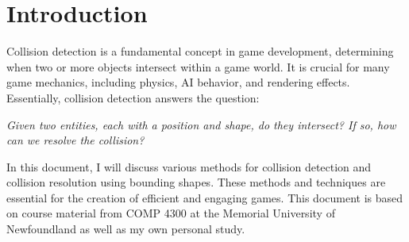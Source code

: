 \section{Introduction}
Collision detection is a fundamental concept in game development, determining
when two or more objects intersect within a game world. It is crucial for many
game mechanics, including physics, AI behavior, and rendering effects.
Essentially, collision detection answers the question:

\begin{displayquote}
    \textit{Given two entities, each with a position and shape, do they intersect? If so,
        how can we resolve the collision?}
\end{displayquote}

In this document, I will discuss various methods for collision detection and
collision resolution using bounding shapes. These methods and techniques are
essential for the creation of efficient and engaging games. This document is
based on course material from COMP 4300 at the Memorial University of
Newfoundland as well as my own personal study.


